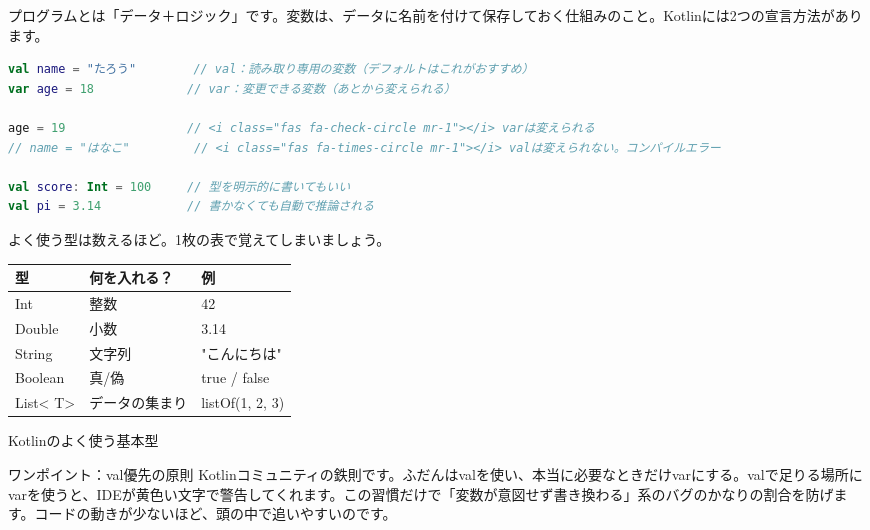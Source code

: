 


プログラムとは「データ＋ロジック」です。変数は、データに名前を付けて保存しておく仕組みのこと。Kotlinには2つの宣言方法があります。

\begin{lstlisting}[language=Kotlin]
val name = "たろう"        // val：読み取り専用の変数（デフォルトはこれがおすすめ）
var age = 18             // var：変更できる変数（あとから変えられる）

age = 19                 // <i class="fas fa-check-circle mr-1"></i> varは変えられる
// name = "はなこ"         // <i class="fas fa-times-circle mr-1"></i> valは変えられない。コンパイルエラー

val score: Int = 100     // 型を明示的に書いてもいい
val pi = 3.14            // 書かなくても自動で推論される
\end{lstlisting}

よく使う型は数えるほど。1枚の表で覚えてしまいましょう。

\begin{center}
\begin{tabularx}{\linewidth}{|X|X|X|}
\hline
\textbf{型} & \textbf{何を入れる？} & \textbf{例} \tabularnewline
\hline
Int & 整数 & 42 \tabularnewline
Double & 小数 & 3.14 \tabularnewline
String & 文字列 & "こんにちは" \tabularnewline
Boolean & 真/偽 & true / false \tabularnewline
List< T> & データの集まり & listOf(1, 2, 3) \tabularnewline
\hline
\end{tabularx}
\end{center}

\begin{center}\small\color{gray}Kotlinのよく使う基本型\end{center}

\begin{tcbinfo}{ワンポイント：val優先の原則}
Kotlinコミュニティの鉄則です。ふだんはvalを使い、本当に必要なときだけvarにする。valで足りる場所にvarを使うと、IDEが黄色い文字で警告してくれます。この習慣だけで「変数が意図せず書き換わる」系のバグのかなりの割合を防げます。コードの動きが少ないほど、頭の中で追いやすいのです。

\end{tcbinfo}

